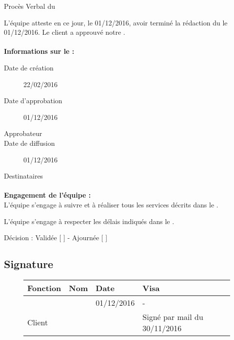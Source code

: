 \documentclass[asi, sansVersion]{picInsa}
\begin{document}
 
 \begin{center}
  \LARGE{}
    Procès Verbal du \DSE \\
 \end{center}
 
 \normalsize{}
 
L'équipe \nomEquipe{} atteste en ce jour, le 01/12/2016, avoir terminé la rédaction du \DSE{} le 01/12/2016.
Le client a approuvé notre \DSE.


\paragraph{}
\textbf{Informations sur le \DSECourt{} :}

\begin{description}
  \item[Date de création]22/02/2016
  \item[Date d'approbation]01/12/2016
  \item[Approbateur]\nomClient
  \item[Date de diffusion] 01/12/2016
  \item[Destinataires]\nomEquipe
\end{description}

\paragraph{}
\textbf{Engagement de l'équipe :}\\


L'équipe \nomEquipe{} s'engage à suivre et à réaliser tous les services décrits dans le \DSE.


L'équipe \nomEquipe{} s'engage à respecter les délais indiqués dans le \DSE.


\begin{center}
Décision : Validée [ \checkmark{} ] - Ajournée [ ]
\end{center}

\subsection*{Signature}
\begin{figure}[H]
		\centering
		\begin{tabularx}{17cm}{|p{4cm}|X|X|X|X|}
		\hline
		\rowcolor[gray]{0.85} Fonction & Nom & Date & Visa \\
		\hline
		\CP{} & \Pierre{} & 01/12/2016 & - \\
		\hline
		Client & \nomClient &  & Signé par mail du 30/11/2016  \\
		\hline
		\end{tabularx}
\end{figure}
\end{document}
